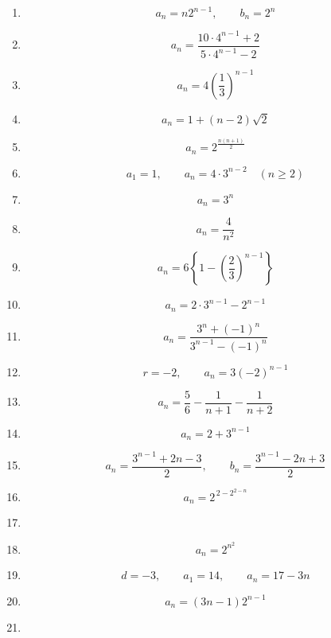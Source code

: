 \begin{enumerate}[label=\textbf{問\arabic*.},leftmargin=3.8em,format=\bookitemlink{practice-basic}{answer}{solution}]
\[      a_n=2^n-3^{n-1}
    \]
  \item \[
      a_n=n2^{n-1},\qquad b_n=2^n
    \]
  \item \[
      a_n=\frac{10\cdot4^{n-1}+2}{5\cdot4^{n-1}-2}
    \]
  \item \[
      a_n=4\left(\frac13\right)^{n-1}
    \]
  \item \[
      a_n=1+(n-2)\sqrt2
    \]
  \item \[
      a_n=2^{\frac{n(n+1)}2}
    \]
  \item \[
      a_1=1,\qquad a_n=4\cdot3^{n-2}\quad(n\ge2)
    \]
  \item \[
      a_n=3^n
    \]
  \item \[
      a_n=\frac4{n^2}
    \]
  \item \[
      a_n=6\left\{1-\left(\frac23\right)^{n-1}\right\}
    \]
  \item \[
      a_n=2\cdot3^{n-1}-2^{n-1}
    \]
  \item \[
      a_n=\frac{3^n+(-1)^n}{3^{n-1}-(-1)^n}
    \]
  \item \[
      r=-2,\qquad a_n=3(-2)^{n-1}
    \]
  \item \[
      a_n=\frac56-\frac1{n+1}-\frac1{n+2}
    \]
  \item \[
      a_n=2+3^{n-1}
    \]
  \item \[
      a_n=\frac{3^{n-1}+2n-3}{2},\qquad b_n=\frac{3^{n-1}-2n+3}{2}
    \]
  \item \[
      a_n=2^{\,2-2^{2-n}}
    \]
  \item \BookMathLayout{\[
        a_n=3+(t-3)4^{n-1},\qquad
        \text{定数数列となるのは }t=3
      \]}{
      \[
        \begin{aligned}
          a_n&=3+(t-3)4^{n-1},\\
          &\text{定数数列となるのは }t=3
        \end{aligned}
      \]
    }
  \item \[
      a_n=2^{n^2}
    \]
  \item \[
      d=-3,\qquad a_1=14,\qquad a_n=17-3n
    \]
  \item \[
      a_n=(3n-1)2^{n-1}
    \]
  \item \BookMathLayout{\[
        a_n=\frac{2^n+(-1)^{n-1}}{3},\qquad b_n=\frac{2^{n-1}-(-1)^{n-1}}{3}
      \]}{
      \[
        \begin{aligned}

\end{aligned}\]}
\end{enumerate}
